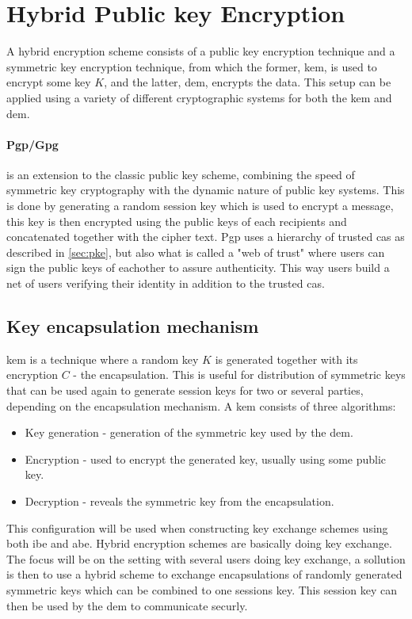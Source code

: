 \section{Hybrid Public key Encryption}\label{sec:hybrid}
A hybrid encryption scheme \cite{hybrid_enc} consists of a public key encryption technique and a symmetric key encryption technique, from which the former, \gls{kem}, is used to encrypt some key $K$, and the latter, \gls{dem}, encrypts the data. This setup can be applied using a variety of different cryptographic systems for both the \gls{kem} and \gls{dem}. 

\paragraph{Pgp/Gpg}\label{pgp}\cite{openpgp, koch2003gnu} is an extension to the classic public key scheme, combining the speed of symmetric key cryptography with the dynamic nature of public key systems. This is done by generating a random session key which is used to encrypt a message, this key is then encrypted using the public keys of each recipients and concatenated together with the cipher text. Pgp uses a hierarchy of trusted \glspl{ca} as described in \ref{sec:pke}, but also what is called a "web of trust" where users can sign the public keys of eachother to assure authenticity. This way users build a net of users verifying their identity in addition to the trusted \glspl{ca}.

\subsection{Key encapsulation mechanism}
\Gls{kem} \cite{kem_kurosawaP14} is a technique where a random key $K$ is generated together with its encryption $C$ - the encapsulation. This is useful for distribution of symmetric keys that can be used again to generate session keys for two or several parties, depending on the encapsulation mechanism. A \gls{kem} consists of three algorithms:
\begin{itemize}
\item Key generation - generation of the symmetric key used by the \gls{dem}.
\item Encryption - used to encrypt the generated key, usually using some public key.
\item Decryption - reveals the symmetric key from the encapsulation.
\end{itemize}

This configuration will be used when constructing key exchange schemes using both \gls{ibe} and \gls{abe}. Hybrid encryption schemes are basically doing key exchange. The focus will be on the setting with several users doing key exchange, a sollution is then to use a hybrid scheme to exchange encapsulations of randomly generated symmetric keys which can be combined to one sessions key. This session key can then be used by the \gls{dem} to communicate securly.




